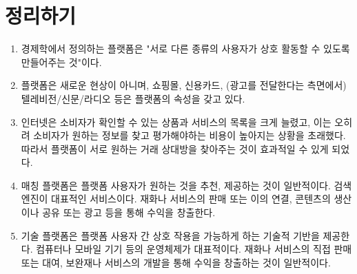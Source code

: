 \pagebreak

\section*{정리하기}
\begin{enumerate}
\item 경제학에서 정의하는 플랫폼은 "서로 다른 종류의 사용자가 상호 활동할 수 있도록 만들어주는 것"이다.
\item 플랫폼은 새로운 현상이 아니며, 쇼핑몰, 신용카드, (광고를 전달한다는 측면에서) 텔레비전/신문/라디오 등은 플랫폼의 속성을 갖고 있다.
\item 인터넷은 소비자가 확인할 수 있는 상품과 서비스의 목록을 크게 늘렸고, 이는 오히려 소비자가 원하는 정보를 찾고 평가해야하는 비용이 높아지는 상황을 초래했다. 따라서 플랫폼이 서로 원하는 거래 상대방을 찾아주는 것이 효과적일 수 있게 되었다.
\item 매칭 플랫폼은 플랫폼 사용자가 원하는 것을 추천, 제공하는 것이 일반적이다. 검색 엔진이 대표적인 서비스이다. 재화나 서비스의 판매 또는 이의 연결, 콘텐츠의 생산이나 공유 또는 광고 등을 통해 수익을 창출한다.
\item 기술 플랫폼은 플랫폼 사용자 간 상호 작용을 가능하게 하는 기술적 기반을 제공한다. 컴퓨터나 모바일 기기 등의 운영체제가 대표적이다. 재화나 서비스의 직접 판매 또는 대여, 보완재나 서비스의 개발을 통해 수익을 창출하는 것이 일반적이다. 
\end{enumerate}


